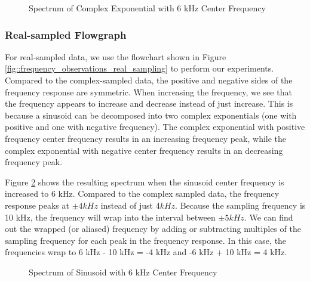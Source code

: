 \documentclass{article}
\begin{document}
\begin{figure}[H]
	\centerline{}
	\caption{Spectrum of Complex Exponential with 6 kHz Center Frequency}
	\label{fig::freq_observations_complex_6k_center_freq}
\end{figure}

\subsubsection{Real-sampled Flowgraph}

For real-sampled data, we use the flowchart shown in Figure \ref{fig::frequency_observations_real_sampling} to perform our experiments. Compared to the complex-sampled data, the positive and negative sides of the frequency response are symmetric. When increasing the frequency, we see that the frequency appears to increase and decrease instead of just increase. This is because a sinusoid can be decomposed into two complex exponentials (one with positive and one with negative frequency). The complex exponential with positive frequency center frequency results in an increasing frequency peak, while the complex exponential with negative center frequency results in an decreasing frequency peak.

Figure \ref{fig::freq_observations_real_6k_center_freq} shows the resulting spectrum when the sinusoid center frequency is increased to 6 kHz. Compared to the complex sampled data, the frequency response peaks at $\pm 4 kHz$ instead of just $4 kHz$. Because the sampling frequency is 10 kHz, the frequency will wrap into the interval between $\pm 5 kHz$. We can find out the wrapped (or aliased) frequency by adding or subtracting multiples of the sampling frequency for each peak in the frequency response. In this case, the frequencies wrap to 6 kHz - 10 kHz = -4 kHz and -6 kHz + 10 kHz = 4 kHz. 

\begin{figure}[H]
	\centerline{}
	\caption{Spectrum of Sinusoid with 6 kHz Center Frequency}
	\label{fig::freq_observations_real_6k_center_freq}
\end{figure}
\end{document}
